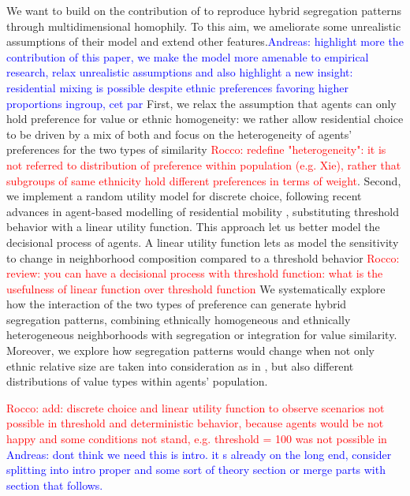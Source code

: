 \documentclass[
]{article}
\begin{document}
We want to build on the contribution of \cite{paolillo2018} to reproduce
hybrid segregation patterns through multidimensional homophily. To this
aim, we ameliorate some unrealistic assumptions of their model and
extend other
features.\textcolor{blue}{{Andreas: }highlight more the contribution of this paper, we make the model more amenable to empirical research, relax unrealistic assumptions and also highlight a new insight: residential mixing is possible despite ethnic preferences favoring higher proportions ingroup, cet par}
First, we relax the assumption that agents can only hold preference for
value or ethnic homogeneity: we rather allow residential choice to be
driven by a mix of both and focus on the heterogeneity of agents'
preferences for the two types of similarity
{\textcolor{red}{Rocco: redefine "heterogeneity": it is not referred to distribution of preference within population (e.g. Xie), rather that subgroups of same ethnicity hold different preferences in terms of weight}}.
Second, we implement a random utility model for discrete choice,
following recent advances in agent-based modelling of residential
mobility \citep{bruch2006neighborhood,bruch2012methodological},
substituting threshold behavior with a linear utility function. This
approach let us better model the decisional process of agents. A linear
utility function lets as model the sensitivity to change in neighborhood
composition \citep{van2009neighborhood} compared to a threshold behavior
{\textcolor{red}{Rocco: review: you can have a decisional process with threshold function: what is the usefulness of linear function over threshold function}}
We systematically explore how the interaction of the two types of
preference can generate hybrid segregation patterns, combining
ethnically homogeneous and ethnically heterogeneous neighborhoods with
segregation or integration for value similarity. Moreover, we explore
how segregation patterns would change when not only ethnic relative size
are taken into consideration as in \cite{paolillo2018}, but also
different distributions of value types within agents' population.

{\textcolor{red}{Rocco: add: discrete choice and linear utility function to observe scenarios not possible in threshold and deterministic behavior, because agents would be not happy and some conditions not stand, e.g. threshold = 100 was not possible in \cite{paolillo2018} }}
\textcolor{blue}{{Andreas: }dont think we need this is intro. it s already on the long end, consider splitting into intro proper and some sort of theory section or merge parts with section that follows.}
\end{document}
